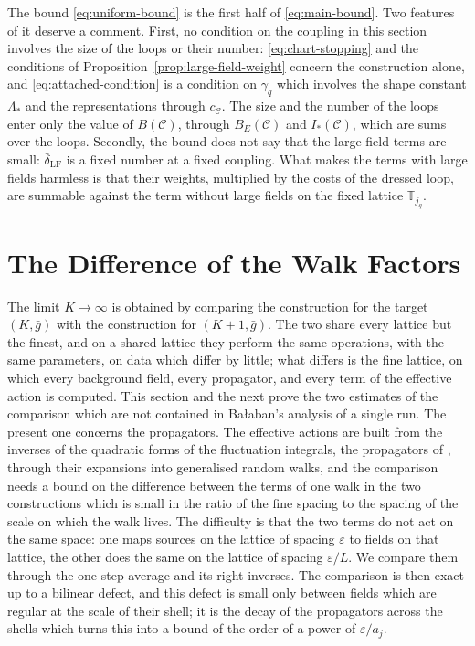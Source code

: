 \documentclass[11pt]{preprint}
\numberwithin{equation}{section}
\theoremstyle{definition}
\theoremstyle{remark}
\theoremstyle{plain}
\begin{document}
The bound \eqref{eq:uniform-bound} is the first half of \eqref{eq:main-bound}. Two features of it deserve a comment. First, no condition on the coupling in this section involves the size of the loops or their number: \eqref{eq:chart-stopping} and the conditions of Proposition~\ref{prop:large-field-weight} concern the construction alone, and \eqref{eq:attached-condition} is a condition on $\gamma_q$ which involves the shape constant $\Lambda_*$ and the representations through $c_{\mathcal C}$. The size and the number of the loops enter only the value of $B(\mathcal C)$, through $B_E(\mathcal C)$ and $I_*(\mathcal C)$, which are sums over the loops. Secondly, the bound does not say that the large-field terms are small: $\bar\delta_{\mathrm{LF}}$ is a fixed number at a fixed coupling. What makes the terms with large fields harmless is that their weights, multiplied by the costs of the dressed loop, are summable against the term without large fields on the fixed lattice $\mathbb T_{j_q}$.

\section{The Difference of the Walk Factors}\label{sec:walk-factor-difference}

The limit $K \to \infty$ is obtained by comparing the construction for the target $(K, \bar g)$ with the construction for $(K + 1, \bar g)$. The two share every lattice but the finest, and on a shared lattice they perform the same operations, with the same parameters, on data which differ by little; what differs is the fine lattice, on which every background field, every propagator, and every term of the effective action is computed. This section and the next prove the two estimates of the comparison which are not contained in Ba{\l}aban's analysis of a single run. The present one concerns the propagators. The effective actions are built from the inverses of the quadratic forms of the fluctuation integrals, the propagators of \cite{BalabanPBG}, through their expansions into generalised random walks, and the comparison needs a bound on the difference between the terms of one walk in the two constructions which is small in the ratio of the fine spacing to the spacing of the scale on which the walk lives. The difficulty is that the two terms do not act on the same space: one maps sources on the lattice of spacing $\varepsilon$ to fields on that lattice, the other does the same on the lattice of spacing $\varepsilon/L$. We compare them through the one-step average and its right inverses. The comparison is then exact up to a bilinear defect, and this defect is small only between fields which are regular at the scale of their shell; it is the decay of the propagators across the shells which turns this into a bound of the order of a power of $\varepsilon/a_j$.
\end{document}
